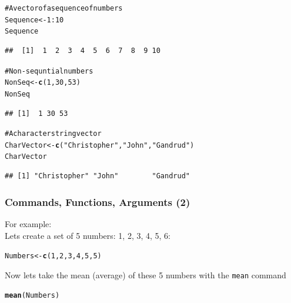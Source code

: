 \documentclass{beamer}\usepackage{graphicx, color}
\makeatletter
\newcommand{\hlfunctioncall}[1]{\textcolor[rgb]{0.501960784313725,0,0.329411764705882}{\textbf{#1}}}%
\newcommand{\hlstring}[1]{\textcolor[rgb]{0.6,0.6,1}{#1}}%
\newcommand{\hlcomment}[1]{\textcolor[rgb]{0.180392156862745,0.6,0.341176470588235}{#1}}%
\newenvironment{kframe}{%
 \def\at@end@of@kframe{}%
 \ifinner\ifhmode%
  \def\at@end@of@kframe{\end{minipage}}%
  \begin{minipage}{\columnwidth}%
 \fi\fi%
 \def\FrameCommand##1{\hskip\@totalleftmargin \hskip-\fboxsep
 \colorbox{shadecolor}{##1}\hskip-\fboxsep
     \hskip-\linewidth \hskip-\@totalleftmargin \hskip\columnwidth}%
 \MakeFramed {\advance\hsize-\width
   \@totalleftmargin\z@ \linewidth\hsize
   \@setminipage}}%
 {\par\unskip\endMakeFramed%
 \at@end@of@kframe}
\newenvironment{knitrout}{}{} %
\makeatother
\begin{document}
\begin{frame}

\begin{knitrout}
\color{fgcolor}\begin{kframe}
\begin{alltt}
\hlcomment{# A vector of a sequence of numbers}
Sequence <- 1:10
Sequence
\end{alltt}
\begin{verbatim}
##  [1]  1  2  3  4  5  6  7  8  9 10
\end{verbatim}
\begin{alltt}

\hlcomment{# Non-sequntial numbers}
NonSeq <- \hlfunctioncall{c}(1, 30, 53)
NonSeq
\end{alltt}
\begin{verbatim}
## [1]  1 30 53
\end{verbatim}
\begin{alltt}

\hlcomment{# A character string vector}
CharVector <- \hlfunctioncall{c}(\hlstring{"Christopher"}, \hlstring{"John"}, \hlstring{"Gandrud"})
CharVector
\end{alltt}
\begin{verbatim}
## [1] "Christopher" "John"        "Gandrud"
\end{verbatim}
\end{kframe}
\end{knitrout}

\end{frame}


\begin{frame}[fragile]
  \frametitle{Commands, Functions, Arguments (2)}
  {\LARGE{For example:}} \\[0.5cm]
  Lets create a set of 5 numbers: 1, 2, 3, 4, 5, 6:

\begin{kframe}
\begin{alltt}
Numbers <- \hlfunctioncall{c}(1, 2, 3, 4, 5, 5)
\end{alltt}
\end{kframe}


Now lets take the mean (average) of these 5 numbers with the {\tt{mean}} command

\begin{kframe}
\begin{alltt}
\hlfunctioncall{mean}(Numbers)
\end{alltt}
\end{kframe}
[1] 3.333



\end{frame}
\end{document}
